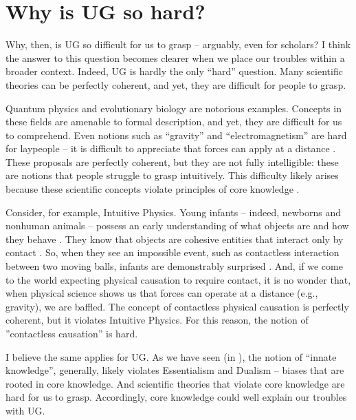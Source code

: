 \documentclass[output=paper,colorlinks,citecolor=brown
]{langscibook}
\begin{document}
\section{Why is UG so hard?}

Why, then, is UG so difficult for us to grasp -- arguably, even for scholars? I think the answer to this question becomes clearer when we place our troubles within a broader context. Indeed, UG is hardly the only ``hard'' question. Many scientific theories can be perfectly coherent, and yet, they are difficult for people to grasp.

Quantum physics and evolutionary biology are notorious examples. Concepts in these fields are amenable to formal description, and yet, they are difficult for us to comprehend. Even notions such as ``gravity'' and ``electromagnetism'' are hard for laypeople -- it is difficult to appreciate that forces can apply at a distance  \citep{chomsky2015kind,shtulman2017scienceblind}. These proposals are perfectly coherent, but they are not fully intelligible: these are notions that people struggle to grasp intuitively. This difficulty likely arises because these scientific concepts violate principles of core knowledge \citep{shtulman2017scienceblind}. 

Consider, for example, Intuitive Physics. Young infants -- indeed, newborns and nonhuman animals -- possess an early understanding of what objects are and how they behave \citep{mascalzoni2013cradle,regolin1995perception,vallortigara2021born}. They know that objects are cohesive entities that interact only by contact \citep{spelke1992origins}. So, when they see an impossible event, such as contactless interaction between two moving balls, infants are demonstrably surprised \citep{mascalzoni2013cradle}. And, if we come to the world expecting physical causation to require contact, it is no wonder that, when physical science shows us that forces can operate at a distance (e.g., gravity), we are baffled. The concept of contactless physical causation is perfectly coherent, but it violates Intuitive Physics.  For this reason, the notion of ''contactless causation'' is hard. 

I believe the same applies for UG. As we have seen (in ), the notion of ``innate knowledge'', generally, likely violates Essentialism and Dualism -- biases that are rooted in core knowledge. And scientific theories that violate core knowledge are hard for us to grasp. Accordingly, core knowledge could well explain our troubles with UG.
\end{document}
